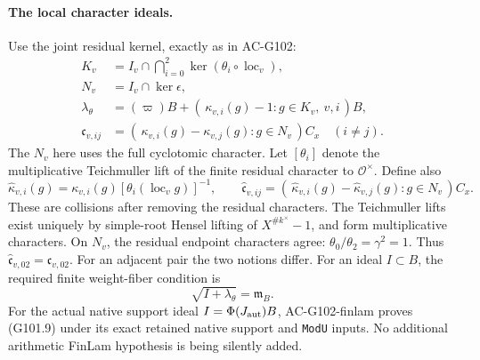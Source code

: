 \paragraph{The local character ideals.}
Use the joint residual kernel, exactly as in AC-G102:
\[
 \begin{split}
 K_v&=I_v\cap\bigcap_{i=0}^2
                   \ker(\theta_i\circ\operatorname{loc}_v),\\
 N_v&=I_v\cap\ker\epsilon,\\
 \lambda_\theta&=(\varpi)B+
       (\,\kappa_{v,i}(g)-1:g\in K_v,\ v,i\,)B,\\
 \mathfrak c_{v,ij}&=
       (\,\kappa_{v,i}(g)-\kappa_{v,j}(g):g\in N_v\,)C_x
                         \quad(i\ne j).
 \end{split}
 \tag{G101.8}
\]
The \(N_v\) here uses the full cyclotomic character.
Let \([\theta_i]\) denote the multiplicative Teichmuller lift of
the finite residual character to \(\mathcal O^\times\).  Define also
\[
 \widehat\kappa_{v,i}(g)
       =\kappa_{v,i}(g)[\theta_i(\operatorname{loc}_v g)]^{-1},
 \qquad
 \widehat{\mathfrak c}_{v,ij}
       =(\,\widehat\kappa_{v,i}(g)-\widehat\kappa_{v,j}(g):
                                                    g\in N_v\,)C_x .
 \tag{G101.8a}
\]
These are collisions after removing the residual characters.
The Teichmuller lifts exist uniquely by simple-root Hensel lifting
of \(X^{\#k^\times}-1\), and form multiplicative characters.
On \(N_v\), the residual endpoint characters agree:
\(\theta_0/\theta_2=\gamma^2=1\).
Thus \(\widehat{\mathfrak c}_{v,02}=\mathfrak c_{v,02}\).
For an adjacent pair the two notions differ.
For an ideal \(I\subset B\), the required finite weight-fiber
condition is
\[
                \sqrt{I+\lambda_\theta}=\mathfrak m_B.
 \tag{G101.9}
\]
For the actual native support ideal
\(I=\Phi(J_{\rm aut})B\), AC-G102-finlam proves (G101.9)
under its exact retained native support and \texttt{ModU} inputs.
No additional arithmetic FinLam hypothesis is being silently added.

